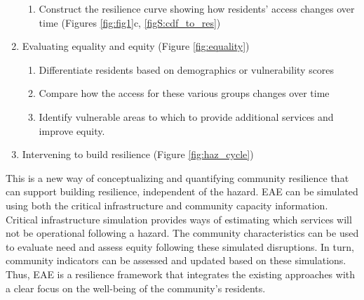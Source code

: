 \documentclass[onecolumn,doublespacing]{risa}
\begin{document}
\begin{enumerate}[topsep=1pt,itemsep=0em,partopsep=1ex,parsep=1ex]
\begin{enumerate}[topsep=0pt,itemsep=-2pt,partopsep=1ex,parsep=1ex]
        \item Construct the resilience curve showing how residents' access changes over time (Figures \ref{fig:fig1}c, \ref{figS:cdf_to_res})
    \end{enumerate}
    \item Evaluating equality and equity (Figure \ref{fig:equality})
    \begin{enumerate}[topsep=0pt,itemsep=-2pt,partopsep=1ex,parsep=1ex]
        \item Differentiate residents based on demographics or vulnerability scores
        \item Compare how the access for these various groups changes over time
        \item Identify vulnerable areas to which to provide additional services and improve equity.
    \end{enumerate}
    \item Intervening to build resilience (Figure \ref{fig:haz_cycle})
\end{enumerate}

This is a new way of conceptualizing and quantifying community resilience that can support building resilience, independent of the hazard.
EAE can be simulated using both the critical infrastructure and community capacity information.
Critical infrastructure simulation provides ways of estimating which services will not be operational following a hazard.
The community characteristics can be used to evaluate need and assess equity following these simulated disruptions.
In turn, community indicators can be assessed and updated based on these simulations.
Thus, EAE is a resilience framework that integrates the existing approaches with a clear focus on the well-being of the community's residents.
\end{document}
